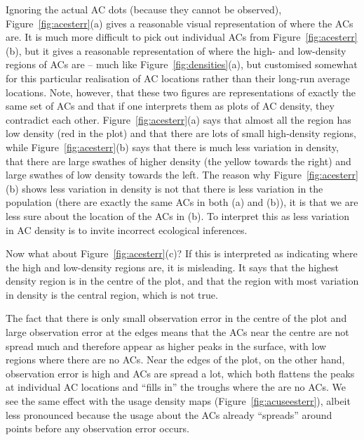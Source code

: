 \documentclass[10pt,a4paper]{article}
\begin{document}
Ignoring the actual AC dots (because they cannot be observed), Figure~\ref{fig:acesterr}(a) gives a reasonable visual representation of where the ACs are. It is much more difficult to pick out individual ACs from Figure~\ref{fig:acesterr}(b), but it gives a reasonable representation of where the high- and low-density regions of ACs are -- much like Figure~\ref{fig:densities}(a), but customised somewhat for this particular realisation of AC locations rather than their long-run average locations. Note, however, that these two figures are representations of exactly the same set of ACs and that if one interprets them as plots of AC density, they contradict each other. Figure~\ref{fig:acesterr}(a) says that almost all the region has low density (red in the plot) and that there are lots of small high-density regions, while Figure~\ref{fig:acesterr}(b) says that there is much less variation in density, that there are large swathes of higher density (the yellow towards the right) and large swathes of low density towards the left. The reason why Figure~\ref{fig:acesterr}(b) shows less variation in density is not that there is less variation in the population (there are exactly the same ACs in both (a) and (b)), it is that we are less sure about the location of the ACs in (b). To interpret this as less variation in AC density is to invite incorrect ecological inferences.

Now what about Figure~\ref{fig:acesterr}(c)? If this is interpreted as indicating where the high and low-density regions are, it is misleading. It says that the highest density region is in the centre of the plot, and that the region with most variation in density is the central region, which is not true. 

The fact that there is only small observation error in the centre of the plot and large observation error at the edges means that the ACs near the centre are not spread much and therefore appear as higher peaks in the surface, with low regions where there are no ACs. Near the edges of the plot, on the other hand, observation error is high and ACs are spread a lot, which both flattens the peaks at individual AC locations and ``fills in'' the troughs where the are no ACs. We see the same effect with the usage density maps (Figure~\ref{fig:acuseesterr}), albeit less pronounced because the usage about the ACs already ``spreads'' around points before any observation error occurs.
\end{document}
